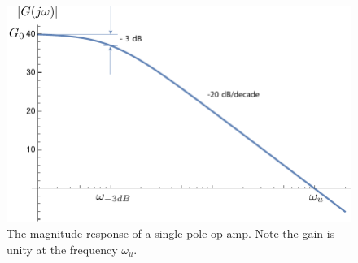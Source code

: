 \begin{figure}[t]
\centering
\includegraphics[width=.85\columnwidth]{mag1pole}
\caption{The magnitude response of a single pole op-amp.  Note the gain is unity at the frequency $\omega_u$.}
\label{fig:mag1pole}
\end{figure}
